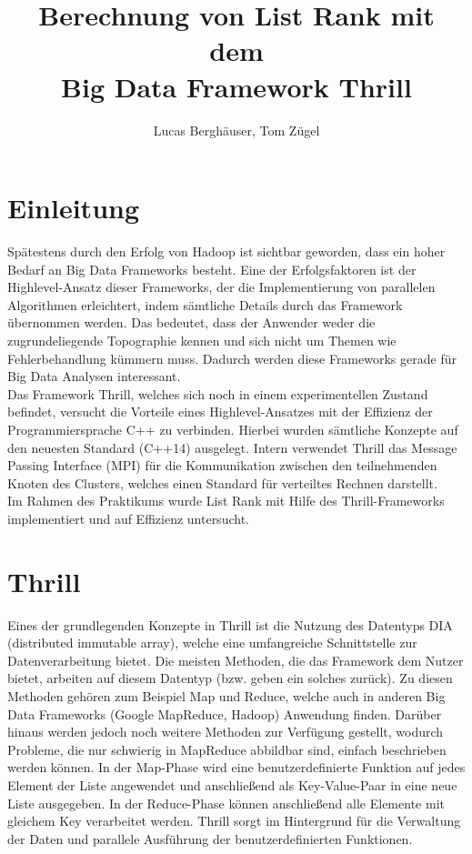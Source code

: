 \documentclass[a0,portrait]{a0poster}
\author{Lucas Berghäuser, Tom Zügel}
\title{Berechnung von List Rank mit dem\\ Big Data Framework Thrill}
\begin{document}
    \begin{multicols}{2}
        
\section*{Einleitung}
Spätestens durch den Erfolg von Hadoop ist sichtbar geworden, dass ein hoher
 Bedarf an Big Data Frameworks besteht. Eine der Erfolgsfaktoren ist der
 Highlevel-Ansatz dieser Frameworks, der die Implementierung von parallelen
 Algorithmen erleichtert, indem sämtliche Details durch das Framework übernommen
 werden. Das bedeutet, dass der Anwender weder die zugrundeliegende
 Topographie kennen und sich nicht um Themen wie Fehlerbehandlung kümmern muss. Dadurch werden diese Frameworks gerade für Big Data Analysen interessant.\\
 Das Framework Thrill, welches sich noch in einem experimentellen Zustand
 befindet, versucht die Vorteile eines Highlevel-Ansatzes mit der Effizienz der
 Programmiersprache C++ zu verbinden. Hierbei wurden sämtliche Konzepte auf den
 neuesten Standard (C++14) ausgelegt. Intern verwendet Thrill das Message
 Passing Interface (MPI) für die Kommunikation zwischen den teilnehmenden Knoten
 des Clusters, welches einen Standard für verteiltes Rechnen darstellt.\\
 Im Rahmen des Praktikums wurde List Rank mit Hilfe des Thrill-Frameworks
 implementiert und auf Effizienz untersucht.
 
\section*{Thrill}
Eines der grundlegenden Konzepte in Thrill ist die Nutzung des Datentyps
DIA (distributed immutable array), welche eine umfangreiche Schnittstelle zur
Datenverarbeitung bietet. Die meisten Methoden, die das Framework dem Nutzer bietet, arbeiten auf diesem Datentyp (bzw. geben ein solches zurück). Zu diesen Methoden gehören zum
Beispiel Map und Reduce, welche auch in anderen Big Data Frameworks (Google
MapReduce, Hadoop) Anwendung finden. Darüber hinaus werden jedoch noch weitere
Methoden zur Verfügung gestellt, wodurch Probleme, die nur schwierig in
MapReduce abbildbar sind, einfach beschrieben werden können.
In der Map-Phase wird eine benutzerdefinierte Funktion auf jedes Element der Liste
angewendet und anschließend als Key-Value-Paar in eine neue Liste
ausgegeben. In der Reduce-Phase können anschließend alle Elemente mit gleichem
Key verarbeitet werden. Thrill sorgt im Hintergrund für die Verwaltung der Daten
und parallele Ausführung der benutzerdefinierten Funktionen.


\end{multicols}
\end{document}
